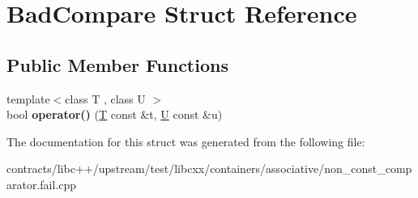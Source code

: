 \hypertarget{struct_bad_compare}{}\section{Bad\+Compare Struct Reference}
\label{struct_bad_compare}
\subsection*{Public Member Functions}
\begin{DoxyCompactItemize}
\item 
\mbox{\label{struct_bad_compare_a73f9128d74666a67ab64e7db63dfd4c8}} 
{\footnotesize template$<$class T , class U $>$ }\\bool {\bfseries operator()} (\mbox{\hyperlink{struct_t}{T}} const \&t, \mbox{\hyperlink{union_u}{U}} const \&u)
\end{DoxyCompactItemize}


The documentation for this struct was generated from the following file\+:\begin{DoxyCompactItemize}
\item 
contracts/libc++/upstream/test/libcxx/containers/associative/non\+\_\+const\+\_\+comparator.\+fail.\+cpp\end{DoxyCompactItemize}
